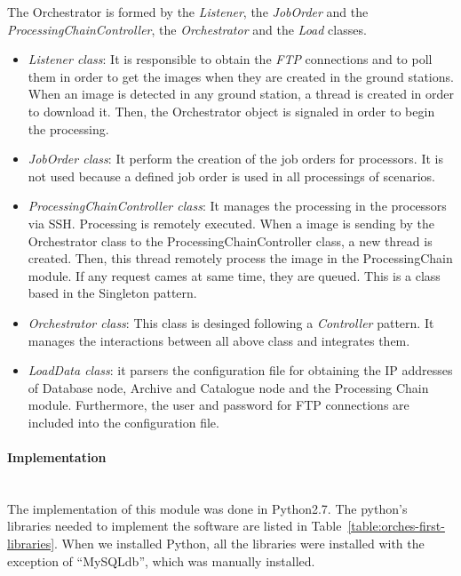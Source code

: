 The Orchestrator is formed by the \emph{Listener}, the \emph{JobOrder} and
the \emph{ProcessingChainController}, the \emph{Orchestrator} and the \emph{Load} classes.

\begin{itemize}
\item \emph{Listener class}: It is responsible to obtain the \emph{FTP}
  connections and to poll them in order to get the images when they are created in the
  ground stations. When an image is detected in any ground station, a thread is
  created in order to download it. Then, the Orchestrator object is signaled in order
  to begin the processing.
\item \emph{JobOrder class}: It perform the creation of the job orders for
  processors. It is not used because a defined job order is used in all
  processings of scenarios.
\item \emph{ProcessingChainController class}: It  manages the processing in the
  processors via \ac{SSH}. Processing is remotely executed. When a image is
  sending by the Orchestrator class to the ProcessingChainController class, a
  new thread is created. Then, this thread remotely process the image in the
  ProcessingChain module. If any request cames at same time, they are queued.
  This is a class based in the Singleton pattern.
\item \emph{Orchestrator class}: This class is desinged following a \emph{Controller}
  pattern. It manages the interactions between all above class and integrates
  them.
\item \emph{LoadData class}: it parsers the configuration file for obtaining the
  \ac{IP} addresses of Database node, Archive and Catalogue node and the
  Processing Chain module. Furthermore, the user and password for \ac{FTP}
  connections are included into the configuration file. 
\end{itemize}



\paragraph{Implementation}~\\

The implementation of this module was done in Python2.7. The python's libraries
needed to implement the software are listed in Table~\ref{table:orches-first-libraries}.
When we installed Python, all the libraries were installed with the exception of “MySQLdb”,
which was manually installed.

